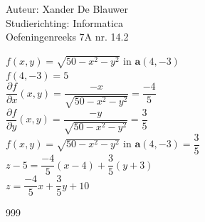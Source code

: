 \documentclass[a4paper]{article}
\begin{document}
\noindent \large Auteur: Xander De Blauwer \\
\noindent \large Studierichting: Informatica\\
\noindent \large Oefeningenreeks 7A nr. 14.2\\

\medskip

\normalsize

$f(x,y) = \sqrt{50 - x^2 - y^2}$ in $\mathbf{a}(4,-3) $ \\

$f(4,-3) = 5$ \\

$\dfrac{\partial f}{\partial x}(x,y) = \dfrac{-x}{\sqrt{50-x^2-y^2}} = \dfrac{-4}{5} $ \\ 

$\dfrac{\partial f}{\partial y}(x,y) = \dfrac{-y}{\sqrt{50-x^2-y^2}} = \dfrac{3}{5} $ \\ 

$f(x,y) = \sqrt{50 - x^2 - y^2}$ in $\mathbf{a}(4,-3) = \dfrac{3}{5} $ \\

$z - 5 = \dfrac{-4}{5}(x-4) + \dfrac{3}{5}(y+3) $ \\

$z = \dfrac{-4}{5}x + \dfrac{3}{5}y + 10 $ \\





\begin{thebibliography}{999}
\end{thebibliography}
\end{document}
